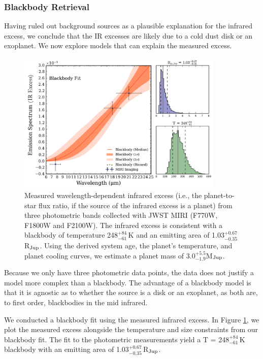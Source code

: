\documentclass[twocolumn]{aastex631}
\begin{document}
\subsubsection{Blackbody Retrieval}

Having ruled out background sources as a plausible explanation for the infrared excess, we conclude that the IR excesses are likely due to a cold dust disk or an exoplanet. We now explore models that can explain the measured excess.

\begin{figure}
\centering
\includegraphics[width=0.88\textwidth]{Figures/Blackbody_Fit.pdf}
\caption{Measured wavelength-dependent infrared excess (i.e., the planet-to-star flux ratio, if the source of the infrared excess is a planet) from three photometric bands collected with JWST MIRI (F770W, F1800W and F2100W). The infrared excess is consistent with a blackbody of temperature 248$^{+84}_{-61}$\,K and an emitting area of 1.03$^{+0.67}_{-0.35}$\,R$_{\rm Jup}$. Using the derived system age, the planet's temperature, and planet cooling curves, we estimate a planet mass of $3.0^{+5.5}_{-1.9}$M$_{\rm Jup}$.}
\label{IRexcess}
\end{figure}

Because we only have three photometric data points, the data does not justify a model more complex than a blackbody. The advantage of a blackbody model is that it is agnostic as to whether the source is a disk or an exoplanet, as both are, to first order, blackbodies in the mid infrared.

We conducted a blackbody fit using the measured infrared excess. In Figure \ref{IRexcess}, we plot the measured excess alongside the temperature and size constraints from our blackbody fit. The fit to the photometric measurements yield a T = 248$^{+84}_{-61}$\,K blackbody with an emitting area of 1.03$^{+0.67}_{-0.35}$\,R$_{\rm Jup}$. 
\end{document}
